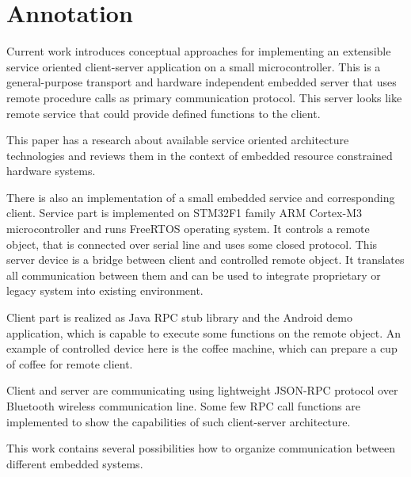 \clearpage\vspace*{\fill}
\section*{Annotation}
Current work introduces conceptual approaches for implementing an extensible
service oriented client-server application on a small microcontroller.
This is a general-purpose transport and hardware independent embedded server
that uses remote procedure calls as primary communication protocol.
This server looks like remote service that could provide defined functions to
the client.

This paper has a research about available service oriented architecture technologies and reviews them in the context of embedded resource constrained hardware systems.

There is also an implementation of a small embedded service and corresponding client.
Service part is implemented on STM32F1 family ARM Cortex-M3 microcontroller and runs FreeRTOS operating system.
It controls a remote object, that is connected over serial line and uses some closed protocol. 
This server device is a bridge between client and controlled remote object. 
It translates all communication between them and can be used to integrate proprietary or legacy system into existing environment. 

Client part is realized as Java RPC stub library  and the Android demo application, which is capable to execute some functions on the remote object.
An example of controlled device here is the coffee machine, which can prepare a cup of coffee for remote client.

Client and server are communicating using lightweight JSON-RPC protocol over Bluetooth wireless communication line.
Some few RPC call functions are implemented to show the capabilities of such client-server architecture.

This work contains several possibilities how to organize communication between different embedded systems.

\vspace{\fill}
\clearpage
